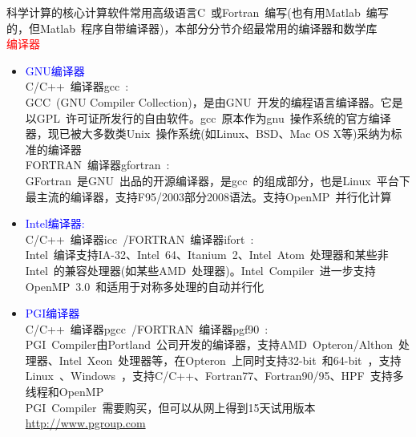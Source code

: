\documentclass{article}      %
\begin{document}
科学计算的核心计算软件常用高级语言\textrm{C~}或\textrm{Fortran~}编写(也有用\textrm{Matlab~}编写的，但\textrm{Matlab~}程序自带编译器)，本部分分节介绍最常用的编译器和数学库\\
\textcolor{red}{编译器}
\begin{itemize}
	\item \textcolor{blue}{GNU编译器}\\
		\textrm{C/C++~}编译器\textrm{gcc~}:\\
		\textrm{GCC~(GNU Compiler Collection)}，是由\textrm{GNU~}开发的编程语言编译器。它是以\textrm{GPL~}许可证所发行的自由软件。\textrm{gcc~}原本作为\textrm{gnu~}操作系统的官方编译器，现已被大多数类\textrm{Unix~}操作系统(如\textrm{Linux}、\textrm{BSD}、\textrm{Mac OS X}等)采纳为标准的编译器\\
		FORTRAN~编译器\textrm{gfortran~}:\\
		\textrm{GFortran~}是\textrm{GNU~}出品的开源编译器，是\textrm{gcc~}的组成部分，也是\textrm{Linux~}平台下最主流的编译器，支持\textrm{F95/2003}部分2008语法。支持\textrm{OpenMP~}并行化计算
	\item \textcolor{blue}{Intel编译器:}\\
		\textrm{C/C++~}编译器\textrm{icc~}/\textrm{FORTRAN~}编译器\textrm{ifort~}:\\
		\textrm{Intel~}编译支持\textrm{IA-32}、\textrm{Intel~64}、\textrm{Itanium~2}、\textrm{Intel~Atom~}处理器和某些非\textrm{Intel~}的兼容处理器(如某些\textrm{AMD~}处理器)。\textrm{Intel~Compiler~}进一步支持\textrm{OpenMP~3.0~}和适用于对称多处理的自动并行化
	\item \textcolor{blue}{PGI编译器}\\
		C/C++~编译器\textrm{pgcc~}/FORTRAN~编译器\textrm{pgf90~}:\\
		\textrm{PGI~Compiler}由\textrm{Portland~}公司开发的编译器，支持\textrm{AMD~Opteron}/\textrm{Althon~}处理器、\textrm{Intel~Xeon~}处理器等，在\textrm{Opteron~}上同时支持\textrm{32-bit~}和\textrm{64-bit~}，支持\textrm{Linux~}、\textrm{Windows~}，支持\textrm{C/C++}、\textrm{Fortran77}、\textrm{Fortran90/95}、\textrm{HPF~}支持多线程和\textrm{OpenMP~}\\
		\textrm{PGI~Compiler~}需要购买，但可以从网上得到15天试用版本\url{http://www.pgroup.com}
\end{itemize}
\end{document}
